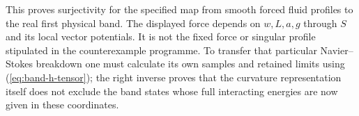This proves surjectivity for the specified map from smooth forced
fluid profiles to the real first physical band. The displayed force
depends on $w,L,a,g$ through $S$ and its local vector potentials.
It is not the fixed force or singular profile stipulated in the
counterexample programme. To transfer that particular Navier--Stokes
breakdown one must calculate its own samples and retained limits
using (\ref{eq:band-h-tensor}); the right inverse proves that the
curvature representation itself does not exclude the band states
whose full interacting energies are now given in these coordinates.
